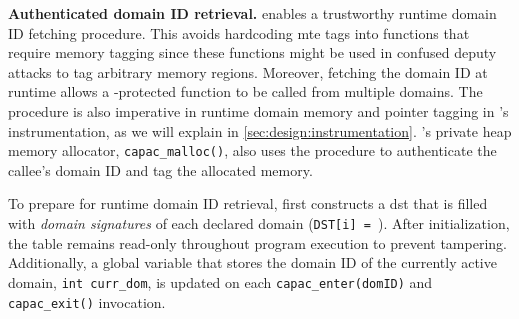 



\textbf{Authenticated domain ID retrieval.}
\thename enables a trustworthy runtime domain ID fetching procedure.
This avoids hardcoding \gls{mte} tags into functions that require memory tagging since these functions might be used in confused deputy attacks to tag arbitrary memory regions.
Moreover, fetching the domain ID at runtime allows a \thename-protected function to be called from multiple domains.
The procedure is also imperative in runtime domain memory and pointer tagging in \thename's instrumentation, as we will explain in \cref{sec:design:instrumentation}.
\thename's private heap memory allocator, \texttt{capac\_malloc()}, also uses the procedure to authenticate the callee's domain ID and tag the allocated memory.

To prepare for runtime domain ID retrieval, \thename first constructs a \gls{dst} that is filled with \emph{domain signatures} of each declared domain ({\tt DST[i] = }).
After initialization, the table remains read-only throughout program execution to prevent tampering.
Additionally, a global variable that stores the domain ID of the currently active domain, \texttt{int curr\_dom}, is updated on each \texttt{capac\_enter(domID)} and \texttt{capac\_exit()} invocation.


